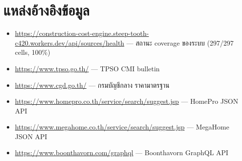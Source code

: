 \section{แหล่งอ้างอิงข้อมูล}

\begin{itemize}
  \item \url{https://construction-cost-engine.steep-tooth-c420.workers.dev/api/sources/health}
        --- สถานะ coverage ของระบบ (297/297 cells, 100\%)
  \item \url{https://www.tpso.go.th/} --- TPSO CMI bulletin
  \item \url{https://www.cgd.go.th/} --- กรมบัญชีกลาง ราคามาตรฐาน
  \item \url{https://www.homepro.co.th/service/search/suggest.jsp} --- HomePro JSON API
  \item \url{https://www.megahome.co.th/service/search/suggest.jsp} --- MegaHome JSON API
  \item \url{https://www.boonthavorn.com/graphql} --- Boonthavorn GraphQL API
\end{itemize}
